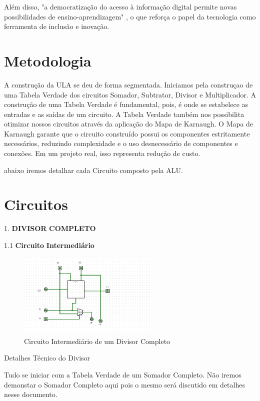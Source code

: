 \documentclass[
12pt,
openright,
oneside,
a4paper,
chapter=TITLE,
english,
brazil,
colorlinks=true,
linkcolor=blue,
citecolor=blue,
filecolor=magenta,
urlcolor=blue
]{abntex2}
\begin{document}
	Além disso, "a democratização do acesso à informação digital permite novas possibilidades de ensino-aprendizagem" , o que reforça o papel da tecnologia como ferramenta de inclusão e inovação.
	
	\chapter{Metodologia}
  A construção da ULA se deu de forma segmentada. Iniciamos pela construçao de uma Tabela Verdade dos circuitos Somador, Subtrator, Divisor e Multiplicador. A construção de uma Tabela Verdade é fundamental, pois, é onde se estabelece as entradas e as saídas de um circuito. A Tabela Verdade também nos possibilita otimizar nossos circuitos através da aplicação do Mapa de Karnaugh.
    O Mapa de Karnaugh garante que o circuito construído possui os componentes estritamente necessários, reduzindo complexidade e o uso desnecessário de componentes e conexões. Em um projeto real, isso representa redução de custo.

    abaixo iremos detalhar cada Circuito composto pela ALU.

  \chapter{Circuitos}

    1. \textbf{DIVISOR} \textbf{COMPLETO}

    1.1 \textbf{Circuito} \textbf{Intermediário}

     \begin{figure}[H]
		\centering
		\includegraphics[width=0.6\textwidth]{Divisor_Estagio_Intermediario.png}
		\caption{Circuito Intermediário de um Divisor Completo}
		\label{fig:exemplo}
	\end{figure}

	Detalhes Técnico do Divisor
	
	Tudo se iniciar com a Tabela Verdade de um Somador Completo. Não iremos demonstar o Somador Completo aqui pois o mesmo será discutido em detalhes nesse documento.
	
\end{document}
